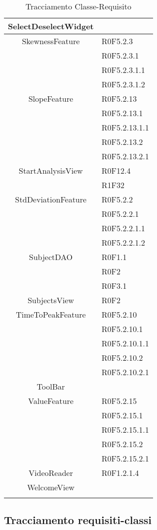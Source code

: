 \begin{center}
\begin{longtable}{|c|l|}
\hline 
SelectDeselectWidget &  \\
\hline 
SkewnessFeature & R0F5.2.3 \\
 & R0F5.2.3.1 \\
 & R0F5.2.3.1.1 \\
 & R0F5.2.3.1.2 \\
\hline 
SlopeFeature & R0F5.2.13 \\
 & R0F5.2.13.1 \\
 & R0F5.2.13.1.1 \\
 & R0F5.2.13.2 \\
 & R0F5.2.13.2.1 \\
\hline 
StartAnalysisView & R0F12.4 \\
 & R1F32 \\
\hline 
StdDeviationFeature & R0F5.2.2 \\
 & R0F5.2.2.1 \\
 & R0F5.2.2.1.1 \\
 & R0F5.2.2.1.2 \\
\hline 
SubjectDAO & R0F1.1 \\
 & R0F2 \\
 & R0F3.1 \\
\hline 
SubjectsView & R0F2 \\
\hline 
TimeToPeakFeature & R0F5.2.10 \\
 & R0F5.2.10.1 \\
 & R0F5.2.10.1.1 \\
 & R0F5.2.10.2 \\
 & R0F5.2.10.2.1 \\
\hline 
ToolBar &  \\
\hline 
ValueFeature & R0F5.2.15 \\
 & R0F5.2.15.1 \\
 & R0F5.2.15.1.1 \\
 & R0F5.2.15.2 \\
 & R0F5.2.15.2.1 \\
\hline 
VideoReader & R0F1.2.1.4 \\
\hline 
WelcomeView &  \\
\hline
\caption{Tracciamento Classe-Requisito}
\end{longtable}
\end{center}

    
\subsection{Tracciamento requisiti-classi}
\label{tracciamentorequisiticlassi}

